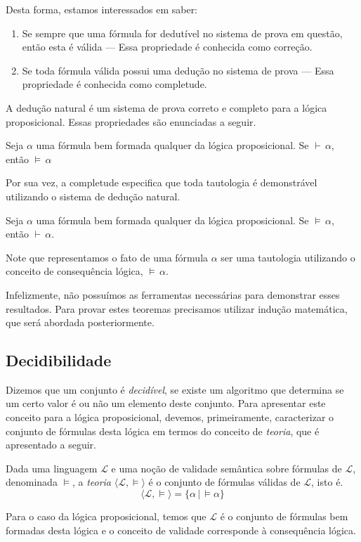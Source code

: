 Desta forma, estamos interessados em saber:
\begin{enumerate}
    \item Se sempre que uma fórmula for dedutível no sistema de prova
      em questão, então esta é válida ---  Essa propriedade é
      conhecida como correção.
    \item Se toda fórmula válida possui uma dedução no sistema de
      prova --- Essa propriedade é conhecida como completude.
\end{enumerate}
A dedução natural é um sistema de
prova correto e completo para a lógica proposicional. Essas
propriedades são enunciadas a seguir.
\begin{Theorem}
Seja $\alpha$ uma fórmula bem formada qualquer da lógica
proposicional. Se $\vdash\,\alpha$, então $\models\,\alpha$
\end{Theorem}
Por sua vez, a completude
especifica que toda tautologia é demonstrável utilizando o sistema de
dedução natural.
\begin{Theorem}
Seja $\alpha$ uma fórmula bem formada qualquer da lógica
proposicional. Se $\models\,\alpha$, então $\vdash\,\alpha$.
\end{Theorem}
Note que representamos o fato de uma fórmula $\alpha$ ser uma
tautologia utilizando o conceito de consequência lógica,
$\models\,\alpha$.

Infelizmente, não possuímos as ferramentas necessárias para demonstrar
esses resultados. Para provar estes teoremas precisamos utilizar
indução matemática, que será abordada posteriormente.

\subsection{Decidibilidade}

Dizemos que um conjunto é \emph{decidível}, se existe um algoritmo que
determina se um certo valor é ou não um elemento deste conjunto. Para
apresentar este conceito para a lógica proposicional, devemos,
primeiramente, caracterizar o conjunto de fórmulas desta lógica em
termos do conceito de \emph{teoria}, que é apresentado a seguir.

\begin{Definition}[Teoria]
Dada uma linguagem $\mathcal{L}$ e uma noção de validade semântica
sobre fórmulas de $\mathcal{L}$, denominada $\models$, a \emph{teoria}
$\langle \mathcal{L}, \models\rangle$ é o conjunto de fórmulas válidas
de $\mathcal{L}$, isto é.
\[
\langle\mathcal{L},\models\rangle = \{\alpha\,|\,\models\alpha\}
\]
\end{Definition}
Para o caso da lógica proposicional, temos que $\mathcal{L}$ é o
conjunto de fórmulas bem formadas desta lógica e o conceito de
validade corresponde à consequência lógica.

